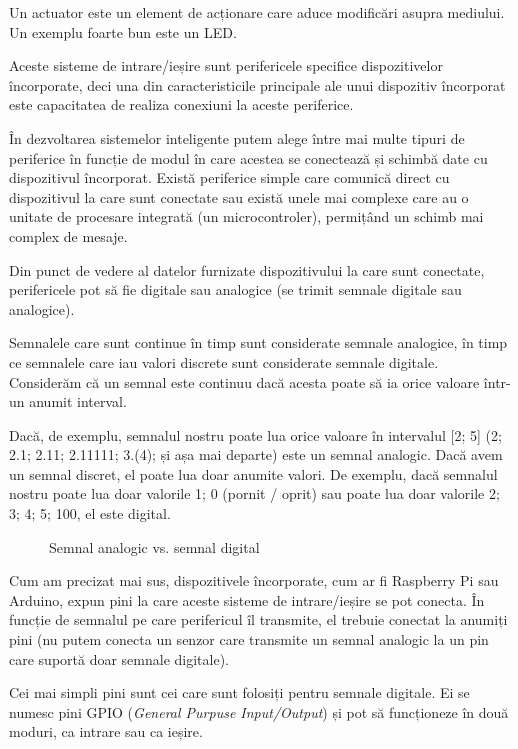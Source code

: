 Un actuator este un element de acționare care aduce modificări asupra mediului.
Un exemplu foarte bun este un LED.

Aceste sisteme de intrare/ieșire sunt perifericele specifice dispozitivelor
încorporate, deci una din caracteristicile principale ale unui dispozitiv
încorporat este capacitatea de realiza conexiuni la aceste periferice.

În dezvoltarea sistemelor inteligente putem alege între mai multe tipuri de
periferice în funcție de modul în care acestea se conectează și schimbă date cu
dispozitivul încorporat. Există periferice simple care comunică direct cu
dispozitivul la care sunt conectate sau există unele mai complexe care au o
unitate de procesare integrată (un microcontroler), permițând un schimb mai
complex de mesaje.

Din punct de vedere al datelor furnizate dispozitivului la care sunt conectate,
perifericele pot să fie digitale sau analogice (se trimit semnale digitale sau
analogice).

Semnalele care sunt continue în timp sunt considerate semnale analogice, în timp
ce semnalele care iau valori discrete sunt considerate semnale digitale.
Considerăm că un semnal este continuu dacă acesta poate să ia orice valoare
într-un anumit interval.

Dacă, de exemplu, semnalul nostru poate lua orice valoare în intervalul [2; 5]
(2; 2.1; 2.11; 2.11111; 3.(4); și așa mai departe) este un semnal analogic. Dacă
avem un semnal discret, el poate lua doar anumite valori. De exemplu, dacă
semnalul nostru poate lua doar valorile {1; 0} (pornit / oprit) sau poate lua
doar valorile {2; 3; 4; 5; 100}, el este digital.

\begin{figure}[htbp]
  \centering
  \def\svgwidth{\columnwidth}
  
  \caption{Semnal analogic vs. semnal digital}
  \label{fig:embed-analog-digital}
\end{figure}

Cum am precizat mai sus, dispozitivele încorporate, cum ar fi Raspberry Pi sau
Arduino, expun pini la care aceste sisteme de intrare/ieșire se pot conecta. În
funcție de semnalul pe care perifericul îl transmite, el trebuie conectat la
anumiți pini (nu putem conecta un senzor care transmite un semnal analogic la un
pin care suportă doar semnale digitale).

Cei mai simpli pini sunt cei care sunt folosiți pentru semnale digitale. Ei se numesc pini
GPIO (\textit{General Purpuse Input/Output}) și pot să funcționeze în două moduri, ca
intrare sau ca ieșire.

